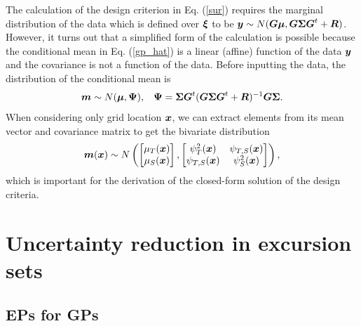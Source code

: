 \documentclass[aoas]{imsart}
\begin{document}
The calculation of the design criterion in Eq. (\ref{sur}) requires
the marginal distribution of the data which is defined over ${\boldsymbol \xi}$ to
be ${\boldsymbol y} \sim N( {\boldsymbol G} {\boldsymbol \mu},{\boldsymbol G} {\boldsymbol \Sigma} {\boldsymbol G}^t+{\boldsymbol R})$.  However, it turns
out that a simplified form of the calculation is possible because the
conditional mean in Eq. (\ref{gp_hat}) is a linear (affine) function of
the data ${\boldsymbol y}$ and the covariance is not a function of the data.
Before inputting the data, the distribution of the conditional mean is
\begin{equation}\label{distxi} \bm \sim N(\bmu , \bPsi), \hspace{3mm}
  \bPsi=\bSigma \bG^t (\bG \bSigma \bG^t+\bR)^{-1} \bG \bSigma.
\end{equation} 
When considering only grid location ${\boldsymbol x}$, we can
extract elements from its mean vector and covariance matrix to get the
bivariate distribution \begin{equation}\label{dist_mxi} 
  \bm(\bx) \sim N \left( \begin{bmatrix}
      \mu_{T}(\bx) \\
      \mu_{S}(\bx) \end{bmatrix}, \begin{bmatrix}
      \psi^2_{T}(\bx) & \psi_{T,S}(\bx)\\
      \psi_{T,S}(\bx) & \psi^2_{S}(\bx) \end{bmatrix} \right),
\end{equation}
which is important for the derivation of the closed-form solution of the design criteria.

\section{Uncertainty reduction in excursion sets}
\label{sec:sur}

\subsection{EPs for GPs}
\end{document}
